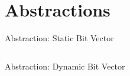 \section{Abstractions}
\begin{frame}[c]{Abstraction: Static Bit Vector}
    \inputminted[linenos=true, fontsize=\small]{rust}{code/traits.rs}
\end{frame}

\begin{frame}[c]{Abstraction: Dynamic Bit Vector}
    \inputminted[linenos=true]{rust}{code/traits_dyn.rs}
\end{frame}
